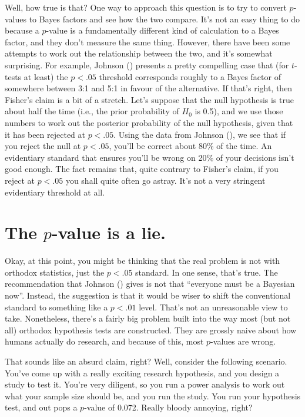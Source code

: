 \documentclass[
  11pt,
  a4paper,
  twoside,symmetric,openright]{book}
\theoremstyle{break}
\theoremstyle{break}
\begin{document}
Well, how true is that? One way to approach this question is to try to convert \(p\)-values to Bayes factors and see how the two compare. It's not an easy thing to do because a \(p\)-value is a fundamentally different kind of calculation to a Bayes factor, and they don't measure the same thing. However, there have been some attempts to work out the relationship between the two, and it's somewhat surprising. For example, Johnson () presents a pretty compelling case that (for \(t\)-tests at least) the \(p<.05\) threshold corresponds roughly to a Bayes factor of somewhere between 3:1 and 5:1 in favour of the alternative. If that's right, then Fisher's claim is a bit of a stretch. Let's suppose that the null hypothesis is true about half the time (i.e., the prior probability of \(H_0\) is 0.5), and we use those numbers to work out the posterior probability of the null hypothesis, given that it has been rejected at \(p<.05\). Using the data from Johnson (), we see that if you reject the null at \(p<.05\), you'll be correct about 80\% of the time. An evidentiary standard that ensures you'll be wrong on 20\% of your decisions isn't good enough. The fact remains that, quite contrary to Fisher's claim, if you reject at \(p<.05\) you shall quite often go astray. It's not a very stringent evidentiary threshold at all.

\section{\texorpdfstring{The \(p\)-value is a lie.}{The p-value is a lie.}}\label{the-p-value-is-a-lie.}

Okay, at this point, you might be thinking that the real problem is not with orthodox statistics, just the \(p<.05\) standard. In one sense, that's true. The recommendation that Johnson () gives is not that ``everyone must be a Bayesian now''. Instead, the suggestion is that it would be wiser to shift the conventional standard to something like a \(p<.01\) level. That's not an unreasonable view to take. Nonetheless, there's a fairly big problem built into the way most (but not all) orthodox hypothesis tests are constructed. They are grossly naive about how humans actually do research, and because of this, most \(p\)-values are wrong.

That sounds like an absurd claim, right? Well, consider the following scenario. You've come up with a really exciting research hypothesis, and you design a study to test it. You're very diligent, so you run a power analysis to work out what your sample size should be, and you run the study. You run your hypothesis test, and out pops a \(p\)-value of 0.072. Really bloody annoying, right?
\end{document}
